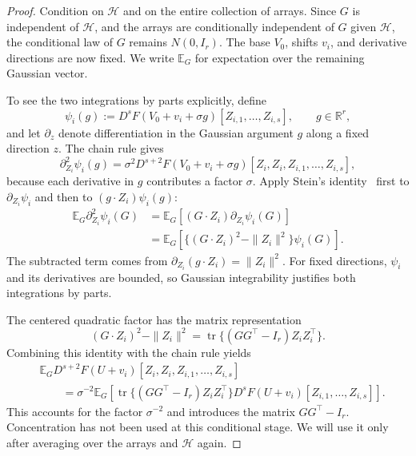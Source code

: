 \documentclass[11pt,letterpaper]{article}
\theoremstyle{remark}
\newcommand{\E}{\mathbb E}
\newcommand{\R}{\mathbb R}
\newcommand{\tr}{\operatorname{tr}}
\begin{document}
\begin{proof}
Condition on $\mathcal H$ and on the entire collection of arrays.
Since $G$ is independent of $\mathcal H$, and the arrays are
conditionally independent of $G$ given $\mathcal H$, the
conditional law of $G$ remains $N(0,I_r)$. The base $V_0$, shifts
$v_i$, and derivative directions are now fixed. We write $\E_G$
for expectation over the remaining Gaussian vector.

To see the two integrations by parts explicitly, define
\[
 \psi_i(g):=D^sF(V_0+v_i+\sigma g)
                  [Z_{i,1},\ldots,Z_{i,s}],\qquad g\in\R^r,
\]
and let $\partial_z$ denote differentiation in the Gaussian
argument $g$ along a fixed direction $z$. The chain rule gives
\[
 \partial_{Z_i}^2\psi_i(g)
 =\sigma^2D^{s+2}F(V_0+v_i+\sigma g)
                  [Z_i,Z_i,Z_{i,1},\ldots,Z_{i,s}],
\]
because each derivative in $g$ contributes a factor $\sigma$.
Apply Stein's identity~\cite{Stein1981} first to
$\partial_{Z_i}\psi_i$ and then to $(g\cdot Z_i)\psi_i(g)$:
\begin{align*}
 \E_G\partial_{Z_i}^2\psi_i(G)
 &=\E_G[(G\cdot Z_i)\partial_{Z_i}\psi_i(G)]\\
 &=\E_G[\{(G\cdot Z_i)^2-\|Z_i\|^2\}\psi_i(G)].
\end{align*}
The subtracted term comes from
$\partial_{Z_i}(g\cdot Z_i)=\|Z_i\|^2$. For fixed directions,
$\psi_i$ and its derivatives are bounded, so Gaussian
integrability justifies both integrations by parts.

The centered quadratic factor has the matrix representation
\[
 (G\cdot Z_i)^2-\|Z_i\|^2
 =\tr\{(GG^\top-I_r)Z_iZ_i^\top\}.
\]
Combining this identity with the chain rule yields
\begin{align*}
 &\E_G D^{s+2}F(U+v_i)[Z_i,Z_i,Z_{i,1},\ldots,Z_{i,s}]\\
 &\qquad=\sigma^{-2}\E_G\left[
       \tr\{(GG^\top-I_r)Z_iZ_i^\top\}
       D^sF(U+v_i)[Z_{i,1},\ldots,Z_{i,s}]\right].
\end{align*}
This accounts for the factor $\sigma^{-2}$ and introduces the
matrix $GG^\top-I_r$. Concentration has not been used at this
conditional stage. We will use it only after averaging over the
arrays and $\mathcal H$ again.


\end{proof}
\end{document}
